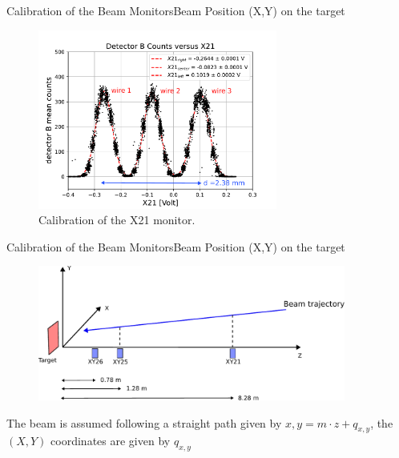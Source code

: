 \documentclass[9pt,a4paper]{beamer}
\begin{document}
\begin{frame}{Calibration of the Beam Monitors}{Beam Position (X,Y) on the target}
\begin{figure}
\includegraphics[width = 0.70\textwidth]{figures/HorizontalCalibration.pdf}
\caption{\footnotesize Calibration of the X21 monitor.}
\end{figure}
\end{frame}

\begin{frame}{Calibration of the Beam Monitors}{Beam Position (X,Y) on the target}

\begin{figure}[hbtp]
\centering
\includegraphics[width = 0.9\textwidth]{figures/scheme.pdf}
\end{figure}

The beam is assumed following a straight path given by $x,y = m\cdot z + q_{x,y}$, the $(X,Y)$ coordinates are given by $q_{x,y}$

\end{frame}
\end{document}
